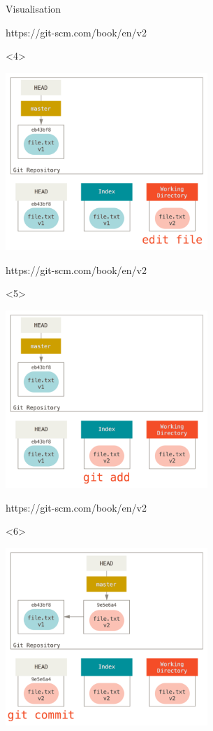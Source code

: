 \documentclass[presentation,aspectratio=169,smaller]{beamer}
\begin{document}
\begin{frame}[label={sec:org1e2aa27}]{Visualisation}
\begin{onlyenv}
\scriptsize{https://git-scm.com/book/en/v2}
\end{onlyenv}

\begin{onlyenv}<4>
\begin{center}
\includegraphics[height=6.7cm]{images/head-3.png}
\end{center}

\scriptsize{https://git-scm.com/book/en/v2}
\end{onlyenv}

\begin{onlyenv}<5>
\begin{center}
\includegraphics[height=6.7cm]{images/head-4.png}
\end{center}

\scriptsize{https://git-scm.com/book/en/v2}
\end{onlyenv}

\begin{onlyenv}<6>
\begin{center}
\includegraphics[height=6.7cm]{images/head-5.png}
\end{center}


\end{onlyenv}
\end{frame}
\end{document}
